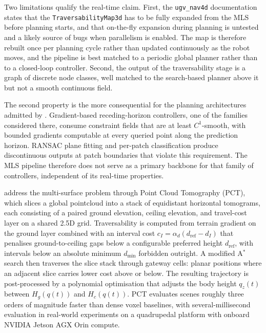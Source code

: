 \documentclass[11pt,a4paper]{article}
\begin{document}
Two limitations qualify the real-time claim. First, the \texttt{ugv\_nav4d} documentation states that the \texttt{TraversabilityMap3d} has to be fully expanded from the MLS before planning starts, and that on-the-fly expansion during planning is untested and a likely source of bugs when parallelism is enabled. The map is therefore rebuilt once per planning cycle rather than updated continuously as the robot moves, and the pipeline is best matched to a periodic global planner rather than to a closed-loop controller. Second, the output of the traversability stage is a graph of discrete node classes, well matched to the search-based planner above it but not a smooth continuous field.

The second property is the more consequential for the planning architectures admitted by . Gradient-based receding-horizon controllers, one of the families considered there, consume constraint fields that are at least $C^1$-smooth, with bounded gradients computable at every queried point along the prediction horizon. RANSAC plane fitting and per-patch classification produce discontinuous outputs at patch boundaries that violate this requirement. The MLS pipeline therefore does not serve as a primary backbone for that family of controllers, independent of its real-time properties.

\citet{yangEfficientGlobalNavigational2024} address the multi-surface problem through Point Cloud Tomography (PCT), which slices a global pointcloud into a stack of equidistant horizontal tomograms, each consisting of a paired ground elevation, ceiling elevation, and travel-cost layer on a shared 2.5D grid. Traversability is computed from terrain gradient on the ground layer combined with an interval cost $c_I = \alpha_d(d_{\text{ref}} - d_I)$ that penalises ground-to-ceiling gaps below a configurable preferred height $d_{\text{ref}}$, with intervals below an absolute minimum $d_{\min}$ forbidden outright. A modified A$^*$ search then traverses the slice stack through gateway cells: planar positions where an adjacent slice carries lower cost above or below. The resulting trajectory is post-processed by a polynomial optimisation that adjusts the body height $q_z(t)$ between $H_g(q(t))$ and $H_c(q(t))$. PCT evaluates scenes roughly three orders of magnitude faster than dense voxel baselines, with several-millisecond evaluation in real-world experiments on a quadrupedal platform with onboard NVIDIA Jetson AGX Orin compute.
\end{document}
